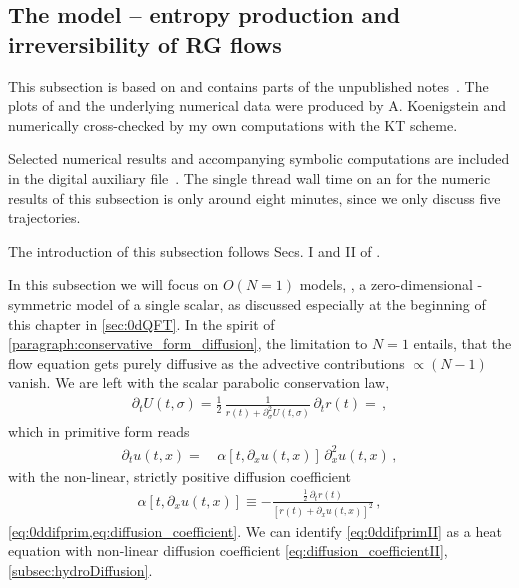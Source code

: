 \subsection{The  model -- entropy production and irreversibility of RG flows}\label{subsec:0dO1Entropy}
\begin{disclaimer}
	This subsection is based on  and contains parts of the unpublished notes~\cite{Koenigstein:fixedPoint}.
	The plots of  and the underlying numerical data were produced by A. Koenigstein and numerically cross-checked by my own computations with the KT scheme.
	
	Selected numerical results and accompanying symbolic computations are included in the digital auxiliary file~\cite{Steil:2023zeroDN1}.
	The single thread wall time on an \intel{} for the numeric results of this subsection is only around eight minutes, since we only discuss five \frg{} trajectories.
	
	The introduction of this subsection follows Secs. I and II of .
\end{disclaimer}
In this subsection we will focus on $O(N=1)$ models, \ie{}, a zero-dimensional \ZII{}-symmetric model of a single scalar, as discussed especially at the beginning of this chapter in \cref{sec:0dQFT}.
In the spirit of \cref{paragraph:conservative_form_diffusion}, the limitation to $N=1$ entails, that the flow equation gets purely diffusive as the advective contributions $\propto(N-1)$ vanish.
We are left with the scalar parabolic conservation law,
\begin{align}
	\partial_t U ( t, \sigma ) = \frac{1}{2} \,\frac{1}{r ( t ) + \partial_\sigma^2 U ( t, \sigma )}\, \partial_t r ( t ) = %
	\, ,	\label{eq:o(1)_wetterich_equation}
\end{align}	
which in primitive form reads
\begin{align}
	\partial_t u ( t, x ) = \, & \alpha[t,\partial_x u ( t, x )] \, \partial_x^2 u ( t, x ) \, ,\label{eq:0ddifprimII}
\end{align}
with the non-linear, strictly positive diffusion coefficient
\begin{align}
	\alpha[t,\partial_x u ( t, x )] \equiv - \frac{\tfrac{1}{2} \, \partial_t r ( t )}{[ r ( t ) + \partial_x u ( t, x ) ]^2} \, ,	\label{eq:diffusion_coefficientII}
\end{align}
\cf{} \cref{eq:0ddifprim,eq:diffusion_coefficient}.
We can identify \cref{eq:0ddifprimII} as a heat equation with non-linear diffusion coefficient \eqref{eq:diffusion_coefficientII}, \cf{} \cref{subsec:hydroDiffusion}.
